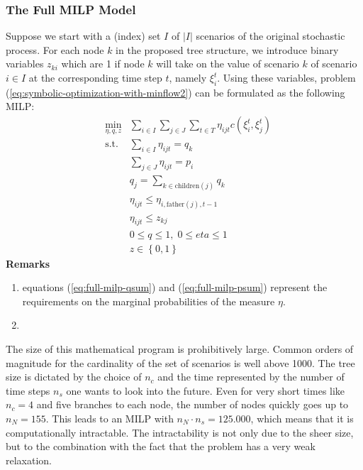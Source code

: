 \documentclass[a4paper, 12pt] {article}
\begin{document}
\subsubsection{The Full MILP Model}
Suppose we start with a (index) set $I$ of $\left|I\right|$ scenarios of the original stochastic process. For each node $k$ in the proposed tree structure, we introduce binary variables $z_{ki}$ which are 1 if node $k$ will take on the value of scenario $k$ of scenario $i \in I$ at the corresponding time step $t$, namely $\xi_i^t$. Using these variables, problem (\ref{eq:symbolic-optimization-with-minflow2}) can be formulated as the following MILP:
\begin{eqnarray}
  \label{eq:full-milp-objective}
  &\min_{\eta, q, z}&\sum_{i\in I}\sum_{j\in J}\sum_{t\in T}\eta_{ijt}c(\xi_i^t,\xi_j^t)\\
  \label{eq:full-milp-qsum}
  &\mathrm{s.t.}&\sum_{i\in I}\eta_{ijt} = q_k\\
  \label{eq:full-milp-psum}
  &&\sum_{j\in J}\eta_{ijt} = p_i\\
  \label{eq:full-milp-q-distribution}
  &&q_j = \sum_{k\in \mathrm{children}(j)}q_k\\
  \label{eq:full-milp-tree}
  &&\eta_{ijt} \leq \eta_{i,\mathrm{father}(j),t-1}\\
  \label{eq:full-milp-only-selected}
  &&\eta_{ijt} \leq z_{kj} \\%
  \label{eq:full-milp-contibounds}
  &&0\leq q \leq 1,\;0\leq eta \leq 1\\
  \label{eq:full-milp-binarybounds}
  &&z\in \left\{0,1\right\}
\end{eqnarray}
\textbf{Remarks}
\begin{enumerate}
\item equations (\ref{eq:full-milp-qsum}) and (\ref{eq:full-milp-psum}) represent the requirements on the marginal probabilities of the measure $\eta$.
\item 
\end{enumerate}
The size of this mathematical program is prohibitively large. Common orders of magnitude for the cardinality of the set of scenarios is well above 1000. The tree size is dictated by the choice of $n_c$ and the time represented by the number of time steps $n_s$ one wants to look into the future. Even for very short times like $n_c=4$ and five branches to each node, the number of nodes quickly goes up to $n_N=155$. This leads to an MILP with $n_N\cdot n_s=125.000$, which means that it is computationally intractable. The intractability is not only due to the sheer size, but to the combination with the fact that the problem has a very weak relaxation.
\end{document}
